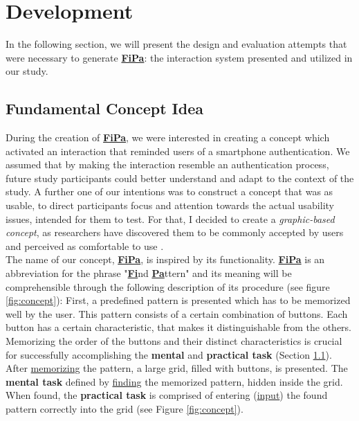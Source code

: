 \section{Development} \label{4.2}

In the following section, we will present the design and evaluation attempts that were necessary to generate \underline{\textbf{FiPa}}: the interaction system presented and utilized in our study. 

\subsection{Fundamental Concept Idea} \label{4.2.1}

During the creation of \underline{\textbf{FiPa}}, we were interested in creating a concept which activated an interaction that reminded users of a smartphone authentication. We assumed that by making the interaction resemble an authentication process, future study participants could better understand and adapt to the context of the study. A further one of our intentions was to construct a concept that was as usable, to direct participants focus and attention towards the actual usability issues, intended for them to test. For that, I decided to create a \textit{graphic-based concept}, as researchers have discovered them to be commonly accepted by users and perceived as comfortable to use \cite{PatternWild}. \\ 

The name of our concept, \underline{\textbf{FiPa}}, is inspired by its functionality. \underline{\textbf{FiPa}} is an abbreviation for the phrase "\underline{\textbf{Fi}}nd \underline{\textbf{Pa}}ttern" and its meaning will be comprehensible through the following description of its procedure (see figure \ref{fig:concept}): First, a predefined pattern is presented which has to be memorized well by the user. This pattern consists of a certain combination of buttons. Each button has a certain characteristic, that makes it distinguishable from the others. Memorizing the order of the buttons and their distinct characteristics is crucial for successfully accomplishing the \textbf{mental} and \textbf{practical task} (Section \ref{4.2.1}). After \underline{memorizing} the pattern, a large grid, filled with buttons, is presented. The \textbf{mental task} defined by \underline{finding} the memorized pattern, hidden inside the grid. When found, the \textbf{practical task} is comprised of entering  (\underline{input}) the found pattern correctly into the grid (see Figure \ref{fig:concept}).\\

